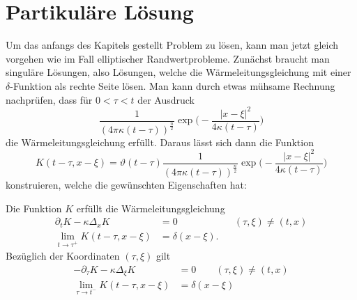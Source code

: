 %
%
%
\section{Partikuläre Lösung}
Um das anfangs des Kapitels gestellt Problem zu lösen, kann man jetzt
gleich vorgehen wie im Fall elliptischer Randwertprobleme. Zunächst
braucht man singuläre Lösungen, also Lösungen, welche die
Wärmeleitungsgleichung mit einer $\delta$-Funktion als rechte Seite
lösen.
Man kann durch etwas mühsame Rechnung nachprüfen, dass für $0<\tau<t$
der Ausdruck
\[
\frac1{(4\pi\kappa(t-\tau))^{\frac{n}2}}
\exp\biggl(-\frac{|x-\xi|^2}{4\kappa(t-\tau)}\biggr)
\]
die Wärmeleitungsgleichung erfüllt. Daraus lässt sich
dann die Funktion
\begin{equation}
K(t-\tau, x-\xi)
=
\vartheta(t-\tau)
\frac1{(4\pi\kappa(t-\tau))^{\frac{n}2}}
\exp\biggl(-\frac{|x-\xi|^2}{4\kappa(t-\tau)}\biggr)
\label{parabolischsingulaer}
\end{equation}
konstruieren, welche die gewünschten Eigenschaften hat:

\begin{satz}
Die Funktion $K$ erfüllt die Wärmeleitungsgleichung
\begin{align*}
\partial_tK-\kappa\Delta_xK&=0&&(\tau, \xi)\ne(t,x)
\\
\lim_{t\to\tau^+}K(t-\tau, x-\xi)&=\delta(x-\xi).
\end{align*}
Bezüglich der Koordinaten $(\tau,\xi)$ gilt
\begin{align*}
-\partial_{\tau} K-\kappa\Delta_{\xi}K&=0\qquad(\tau,\xi)\ne(t,x)
\\
\lim_{\tau\to t^-}K(t-\tau, x-\xi)&=\delta(x-\xi)
\end{align*}
\end{satz}

